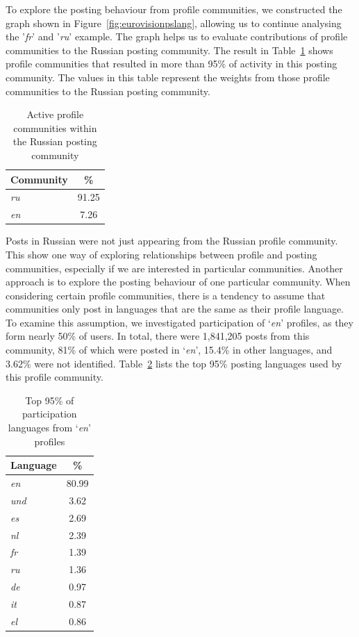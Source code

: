 {To explore the posting behaviour from profile communities, we
constructed the graph shown in Figure~\ref{fig:eurovisionpslang},
allowing us to continue analysing the '{\emph{fr}}' and '{\emph{ru}}'
example.  The graph helps us to evaluate contributions of profile
communities to the Russian posting community.  The result in
Table~\ref{tbl:russian} shows profile communities that resulted in
more than 95\% of activity in this posting community. The values in
this table represent the weights from those profile communities to the
Russian posting community.

\begin{table}[!htb]
\centering
\begin{tabular}{@{}lc}
\toprule
\textbf{Community} & \textbf{\%} \\ 
\midrule
{\emph{ru}} & 91.25 \\
{\emph{en}} & 7.26 \\
\bottomrule
\end{tabular}
\caption{Active profile communities within the Russian posting community}
\label{tbl:russian}
\end{table}

Posts in Russian were not just appearing from the Russian profile
community. This show one way of exploring relationships between
profile and posting communities, especially if we are interested in
particular communities. Another approach is to explore the posting
behaviour of one particular community. When considering certain
profile communities, there is a tendency to assume that communities
only post in languages that are the same as their profile language. To
examine this assumption, we investigated participation of
`{\emph{en}}' profiles, as they form nearly 50\% of users. In total,
there were 1,841,205 posts from this community, 81\% of which were
posted in `{\emph{en}}', 15.4\% in other languages, and 3.62\% were
not identified. Table~\ref{tbl:enpartlangs} lists the top 95\% posting
languages used by this profile community.

\begin{table}[!htb]
\centering
\begin{tabular}{@{}lc}
\toprule
\textbf{Language} & \textbf{\%} \\ 
\midrule
{\emph{en}} & 80.99 \\
{\emph{und}} & 3.62 \\
{\emph{es}} & 2.69 \\
{\emph{nl}} & 2.39 \\
{\emph{fr}} & 1.39 \\
{\emph{ru}} & 1.36 \\
{\emph{de}} & 0.97 \\
{\emph{it}} & 0.87 \\ 
{\emph{el}} & 0.86 \\ 
\bottomrule
\end{tabular}
\caption{Top 95\% of participation languages from `{\emph{en}}' profiles}
\label{tbl:enpartlangs}
\end{table}

}
